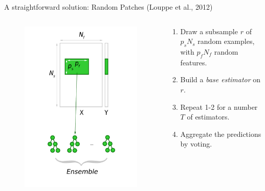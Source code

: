 \documentclass{beamer}
\begin{document}
\begin{frame}{A straightforward solution: Random Patches {\scriptsize (Louppe et al., 2012)}}

\begin{columns}[t]
\begin{column}[t]{0.4\textwidth}

\begin{figure}
\vspace{-1cm}
\includegraphics[scale=0.35]{figures/rp-1.pdf}
\end{figure}

\end{column}

\begin{column}{0.6\textwidth}

\begin{enumerate}
\item Draw a subsample $r$ of $p_s N_s$ random examples, with $p_f N_f$ random features.
\item Build a {\it base estimator} on $r$.
\item Repeat 1-2 for a number $T$ of estimators.
\item Aggregate the predictions by voting.
\end{enumerate}


\end{column}
\end{columns}
\end{frame}
\end{document}

